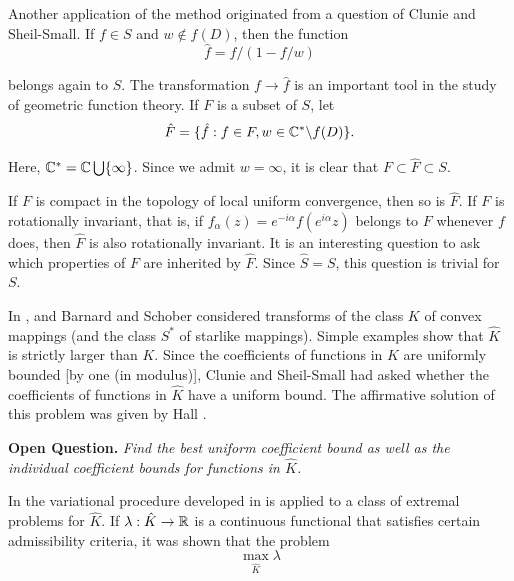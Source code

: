 \documentclass[final]{siamltex}
\begin{document}
\vspace{0.1in}

Another application of the method originated from a question of Clunie and Sheil-Small.  If $f \in S$ and 
$w \not\in f(D)$, then the function
\begin{equation}
\hat{f} = f / (1-f/w) \label{eq10}
\end{equation}

\noindent belongs again to $S$.  The transformation $f \rightarrow \hat{f}$ is an important tool in the study
of geometric function theory.  If $F$ is a subset of $S$, let 
$$\hat{F} = \{ \hat{f} : f \in F, w \in {\Bbb C}^* \backslash f(D) \}.$$

\noindent Here, ${\Bbb C}^* = {\Bbb C} \bigcup \{ \infty \}$.  Since we admit $w = \infty$, it is clear that $F \subset
\hat{F} \subset S$.


If $F$ is compact in the topology of local uniform convergence, then so is $\hat{F}$.  If $F$ is rotationally invariant, that is,
if $f_\alpha(z) = e^{-i \alpha}f(e^{i \alpha}z)$ belongs to $F$ whenever $f$ does, then $\hat{F}$ is also rotationally invariant.  It is 
an interesting question to ask which properties of $F$ are inherited by $\hat{F}$.  Since $\hat{S} = S$, this question is
trivial for $S$.

In \cite{BarnardSchober1}, \cite{BarnardSchober2} and \cite{BarnardSchober3} Barnard and Schober considered transforms of the class $K$ of convex mappings (and the class $S^*$ of starlike mappings).  Simple examples 
show that $\hat{K}$ is strictly larger than $K$.  Since the coefficients of functions in $K$ are uniformly bounded 
[by one (in modulus)], Clunie and Sheil-Small had asked whether the coefficients of functions in $\hat{K}$ have a uniform
bound.  The affirmative solution of this problem was given by Hall \cite{Hall1}.

\vspace{0.1in}

{\bf Open Question.}  {\em Find the best uniform coefficient bound as well as the individual coefficient bounds for functions
in $\hat{K}$.}

\vspace{0.1in}

In \cite{BarnardSchober1} the variational procedure developed in \cite{BarnardLewis1} is applied to a class of extremal problems for 
$\hat{K}$.  If $\lambda : \hat{K} \rightarrow {\Bbb R}$ is a continuous functional that satisfies certain admissibility
criteria, it was shown that the problem
$$\max_{\hat{K}} \lambda$$ 
\end{document}
